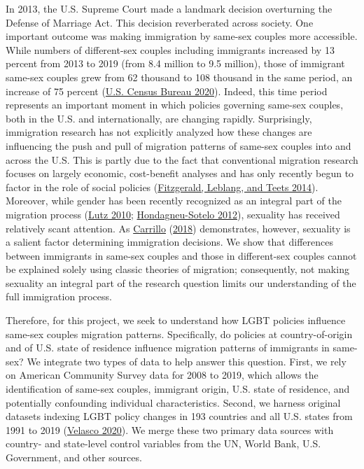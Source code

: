 \documentclass[
  11pt,
]{article}
\begin{document}
In 2013, the U.S. Supreme Court made a landmark decision overturning the Defense of Marriage Act. This decision reverberated across society. One important outcome was making immigration by same-sex couples more accessible. While numbers of different-sex couples including immigrants increased by 13 percent from 2013 to 2019 (from 8.4 million to 9.5 million), those of immigrant same-sex couples grew from 62 thousand to 108 thousand in the same period, an increase of 75 percent (\protect\hyperlink{ref-u.s.censusbureau_2020}{U.S. Census Bureau 2020}). Indeed, this time period represents an important moment in which policies governing same-sex couples, both in the U.S. and internationally, are changing rapidly. Surprisingly, immigration research has not explicitly analyzed how these changes are influencing the push and pull of migration patterns of same-sex couples into and across the U.S. This is partly due to the fact that conventional migration research focuses on largely economic, cost-benefit analyses and has only recently begun to factor in the role of social policies (\protect\hyperlink{ref-fitzgerald_2014}{Fitzgerald, Leblang, and Teets 2014}). Moreover, while gender has been recently recognized as an integral part of the migration process (\protect\hyperlink{ref-lutz_2010}{Lutz 2010}; \protect\hyperlink{ref-hondagneu-sotelo_2012}{Hondagneu-Sotelo 2012}), sexuality has received relatively scant attention. As \protect\hyperlink{ref-carrillo_2018}{Carrillo} (\protect\hyperlink{ref-carrillo_2018}{2018}) demonstrates, however, sexuality is a salient factor determining immigration decisions. We show that differences between immigrants in same-sex couples and those in different-sex couples cannot be explained solely using classic theories of migration; consequently, not making sexuality an integral part of the research question limits our understanding of the full immigration process.

Therefore, for this project, we seek to understand how LGBT policies influence same-sex couples migration patterns. Specifically, do policies at country-of-origin and of U.S. state of residence influence migration patterns of immigrants in same-sex? We integrate two types of data to help answer this question. First, we rely on American Community Survey data for 2008 to 2019, which allows the identification of same-sex couples, immigrant origin, U.S. state of residence, and potentially confounding individual characteristics. Second, we harness original datasets indexing LGBT policy changes in 193 countries and all U.S. states from 1991 to 2019 (\protect\hyperlink{ref-velasco_2020}{Velasco 2020}). We merge these two primary data sources with country- and state-level control variables from the UN, World Bank, U.S. Government, and other sources.
\end{document}
